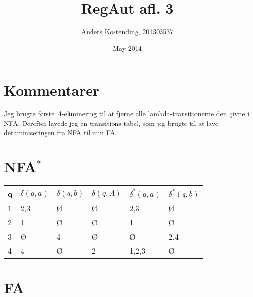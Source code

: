 \documentclass{article}
\title{RegAut afl. 3}
\author{Anders Kostending, 201303537}
\date{May 2014}
\begin{document}
\maketitle

\section*{Kommentarer}
    Jeg brugte første $\Lambda$-eliminering til at fjerne alle lambda-transitionerne den givne i NFA. Derefter lavede jeg en transitions-tabel, som jeg brugte til at lave detaminiseringen fra NFA til min FA. 
    

\section*{NFA$^*$}
    
    \begin{table}
        \centering
        \begin{tabular}{l|lll|ll}
        \hline
        q & $\delta(q,a)$   & $\delta(q,b)$ & $\delta(q,\Lambda)$ & $\delta^*(q,a)$     & $\delta^*(q,b)$   \\
        \hline
        1 & 2,3 & Ø & Ø      & 2,3   & Ø   \\
        2 & 1   & Ø & Ø      & 1     & Ø   \\
        3 & Ø   & 4 & Ø      & Ø     & 2,4 \\
        4 & 4   & Ø & 2      & 1,2,3 & Ø   \\
        \end{tabular}
    \end{table}
    
\section*{FA}
    
\end{document}
